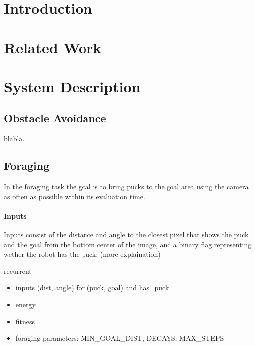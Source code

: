 \documentclass{article}
\begin{document}
	\maketitle
	\section{Introduction} %
	\label{sec:Introduction}


	\section{Related Work} %
	\label{sec:Related Work}
	\cite{heinermanevolution}
	\cite{silva2012odneat}
	\cite{stanley2002evolving, stanley2009hypercube, stanley2006real}

	\section{System Description} %
	\label{sec:method}
	\subsection{Obstacle Avoidance} %
	\label{sub:Obstacle Avoidance}
	blabla.

	\subsection{Foraging} %
	\label{sub:Foraging}
	In the foraging task the goal is to bring pucks to the goal area using the
	camera as often as possible within its evaluation time.

	\paragraph{Inputs} %
	\label{par:Inputs}
	Inputs consist of the distance and angle to the closest pixel that shows
	the puck and the goal from the bottom center of the image, and a binary
	flag representing wether the robot has the puck:
	(more explaination)

	recurrent

	\begin{itemize}
		\item inputs (dist, angle) for (puck, goal) and has\_puck
		\item energy
		\item fitness
		\item foraging parameters: MIN\_GOAL\_DIST, DECAYS, MAX\_STEPS
	\end{itemize}
\end{document}
